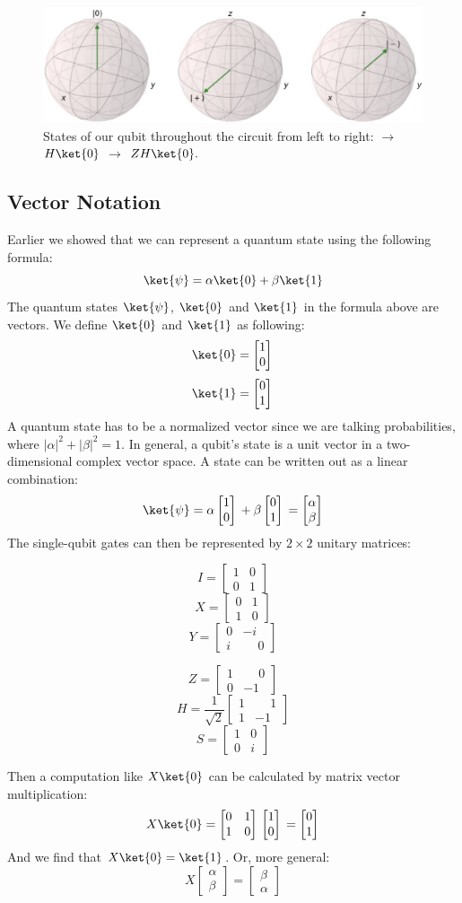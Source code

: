 \documentclass[11pt]{article}
\newcommand{\igate}{
  \begin{bmatrix}
  1 & 0 \\
  0 & 1
  \end{bmatrix}
}
\newcommand{\xgate}{
  \begin{bmatrix}
  0 & 1 \\
  1 & 0
  \end{bmatrix}
}
\newcommand{\ygate}{
  \begin{bmatrix}
  0 & -i \\
  i & \phantom{-}0
  \end{bmatrix}
}
\newcommand{\zgate}{
  \begin{bmatrix}
  1 & \phantom{-}0 \\
  0 & -1
  \end{bmatrix}
}
\newcommand{\hgate}{
  \dfrac{1}{\sqrt2}
  \begin{bmatrix}
  1 & \phantom{-}1 \\
  1 & -1
  \end{bmatrix}
}
\newcommand{\sgate}{
  \begin{bmatrix}
  1 & 0 \\
  0 & i
  \end{bmatrix}
}
\newcommand{\qstatezero}{
  \begin{bmatrix}1 \\ 0\end{bmatrix}
}
\newcommand{\qstateone}{
  \begin{bmatrix}0 \\ 1\end{bmatrix}
}
\begin{document}
\begin{figure}[ht]
  \centering
  \includegraphics[scale=0.37]{images/simple_circuit.eps}
  \caption{States of our qubit throughout the circuit from left to right:  $\rightarrow$ $H\ket{0}$ $\rightarrow$ $ZH\ket{0}.$}
  \label{fig:gate_rotations}
\end{figure}

\subsection{Vector Notation} \label{sec:matrix_notation}
Earlier we showed that we can represent a quantum state using the following formula:
\[\ket{\psi} = \alpha\ket{0} + \beta\ket{1}\]
The quantum states $\ket{\psi}$, $\ket{0}$ and $\ket{1}$ in the formula above are vectors. We define $\ket{0}$ and $\ket{1}$ as following:
\[\ket{0} = \qstatezero{}\]
\[\ket{1} = \qstateone{}\]
A quantum state has to be a normalized vector since we are talking probabilities, where $|\alpha|^2+|\beta|^2 = 1$. In general, a qubit's state is a unit vector in a two-dimensional complex vector space. A state can be written out as a linear combination:
\[
  \ket{\psi} = \alpha\qstatezero{} + \beta\qstateone{} =
\begin{bmatrix}\alpha \\ \beta\end{bmatrix}
\]
The single-qubit gates can then be represented by $2 \times 2$ unitary matrices:
\setlength\multicolsep{0pt}
\begin{multicols}{3}
  \[
    I = \igate{}
  \]
  \vfill
  \[
    X = \xgate{}
  \]
  \vfill
  \[
    Y = \ygate{}
  \]
\end{multicols}

\begin{multicols}{3}
  \[
    Z = \zgate{}
  \]
  \vfill
  \[
    H = \hgate{}
  \]
  \vfill
  \[
    S = \sgate{}
  \]
\end{multicols}
\bigskip
\noindent
Then a computation like $X\ket{0}$ can be calculated by matrix vector multiplication:
\[
X\ket{0} = \xgate{} \qstatezero{} = \qstateone{}
\]
And we find that $X\ket{0} = \ket{1}$. Or, more general:
\[
  X\begin{bmatrix}\alpha \\ \beta\end{bmatrix} = \begin{bmatrix}\beta \\ \alpha\end{bmatrix}
\]
\end{document}
